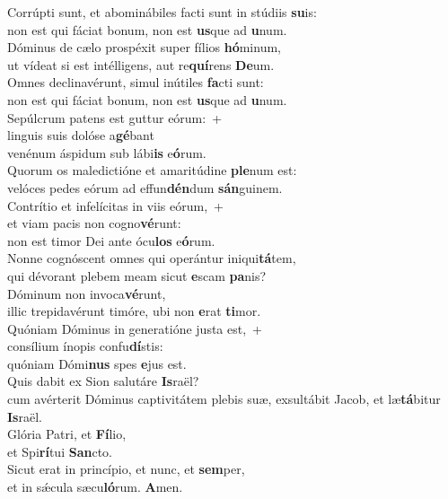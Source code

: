 \evenverse Corrúpti sunt, et abominábiles facti sunt in stúdiis \textbf{su}is:~\*\\
\evenverse non est qui fáciat bonum, non est \textbf{us}que ad \textbf{u}num.\\
\oddverse Dóminus de cælo prospéxit super fílios \textbf{hó}minum,~\*\\
\oddverse ut vídeat si est intélligens, aut re\textbf{quí}rens \textbf{De}um.\\
\evenverse Omnes declinavérunt, simul inútiles \textbf{fa}cti sunt:~\*\\
\evenverse non est qui fáciat bonum, non est \textbf{us}que ad \textbf{u}num.\\
\oddverse Sepúlcrum patens est guttur eórum:~+\\
\oddverse  linguis suis dolóse a\textbf{gé}bant~\*\\
\oddverse venénum áspidum sub lábi\textbf{is} e\textbf{ó}rum.\\
\evenverse Quorum os maledictióne et amaritúdine \textbf{ple}num est:~\*\\
\evenverse velóces pedes eórum ad effun\textbf{dén}dum \textbf{sán}guinem.\\
\oddverse Contrítio et infelícitas in viis eórum,~+\\
\oddverse  et viam pacis non cogno\textbf{vé}runt:~\*\\
\oddverse non est timor Dei ante ócu\textbf{los} e\textbf{ó}rum.\\
\evenverse Nonne cognóscent omnes qui operántur iniqui\textbf{tá}tem,~\*\\
\evenverse qui dévorant plebem meam sicut \textbf{e}scam \textbf{pa}nis?\\
\oddverse Dóminum non invoca\textbf{vé}runt,~\*\\
\oddverse illic trepidavérunt timóre, ubi non \textbf{e}rat \textbf{ti}mor.\\
\evenverse Quóniam Dóminus in generatióne justa est,~+\\
\evenverse  consílium ínopis confu\textbf{dí}stis:~\*\\
\evenverse quóniam Dómi\textbf{nus} spes \textbf{e}jus est.\\
\oddverse Quis dabit ex Sion salutáre \textbf{Is}raël?~\*\\
\oddverse cum avérterit Dóminus captivitátem plebis suæ, exsultábit Jacob, et læ\textbf{tá}bitur \textbf{Is}raël.\\
\evenverse Glória Patri, et \textbf{Fí}lio,~\*\\
\evenverse et Spi\textbf{rí}tui \textbf{San}cto.\\
\oddverse Sicut erat in princípio, et nunc, et \textbf{sem}per,~\*\\
\oddverse et in sǽcula sæcu\textbf{ló}rum. \textbf{A}men.\\
